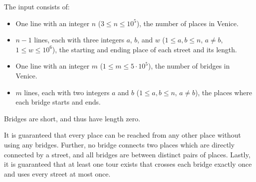 
The input consists of:
\begin{itemize}
\item One line with an integer $n$ ($3\leq n\leq 10^5$), the number of places in Venice.
\item $n-1$ lines, each with three integers $a$, $b$, and $w$ ($1\leq a,b\leq n$, $a \neq b$, $1\leq w\leq10^6$), the starting and ending place of each street and its length.
\item One line with an integer $m$ ($1\leq m\leq5\cdot10^5$), the number of bridges in Venice.
\item $m$ lines, each with two integers $a$ and $b$ ($1\leq a,b\leq n$, $a \neq
b$), the places where each bridge starts and ends.
\end{itemize}

Bridges are short, and thus have length zero.

It is guaranteed that every place can be reached from any other place without using any bridges.
Further, no bridge connects two places which are directly connected by a street,
and all bridges are between distinct pairs of places.
Lastly, it is guaranteed that at least one tour exists that crosses each bridge
exactly once and uses every street at most once.
